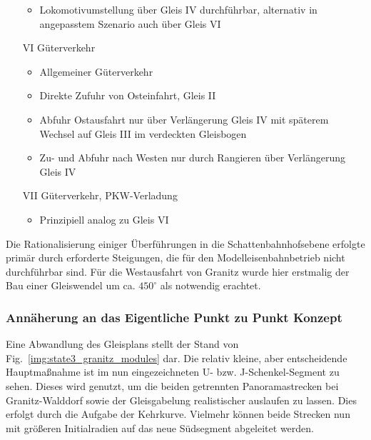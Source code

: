\begin{itemize}
\begin{itemize}
		\item Lokomotivumstellung \"uber Gleis IV durchf\"uhrbar, alternativ in angepasstem Szenario auch \"uber Gleis VI
	\end{itemize}
	\item[VI] G\"uterverkehr
	\begin{itemize}
		\item Allgemeiner G\"uterverkehr
		\item Direkte Zufuhr von Osteinfahrt, Gleis II
		\item Abfuhr Ostausfahrt nur \"uber Verl\"angerung Gleis IV mit sp\"aterem Wechsel auf Gleis III im verdeckten Gleisbogen
		\item Zu- und Abfuhr nach Westen nur durch Rangieren \"uber Verl\"angerung Gleis IV
	\end{itemize}
	\item[VII] G\"uterverkehr, PKW-Verladung
	\begin{itemize}
		\item Prinzipiell analog zu Gleis VI
	\end{itemize}
\end{itemize}
	
Die Rationalisierung einiger \"Uberf\"uhrungen in die Schattenbahnhofsebene erfolgte prim\"ar durch erforderte Steigungen, die f\"ur den Modelleisenbahnbetrieb nicht durchf\"uhrbar sind.
F\"ur die Westausfahrt von Granitz wurde hier erstmalig der Bau einer Gleiswendel um ca. $450^{\circ}$ als notwendig erachtet.



\subsubsection{Ann\"aherung an das Eigentliche Punkt zu Punkt Konzept}
\label{sec:map_development_state3}

Eine Abwandlung des Gleisplans stellt der Stand von Fig.~\ref{img:state3_granitz_modules} dar.
Die relativ kleine, aber entscheidende Hauptma{\ss}nahme ist im nun eingezeichneten U- bzw. J-Schenkel-Segment zu sehen.
Dieses wird genutzt, um die beiden getrennten Panoramastrecken bei Granitz-Walddorf sowie der Gleisgabelung realistischer auslaufen zu lassen.
Dies erfolgt durch die Aufgabe der Kehrkurve.
Vielmehr k\"onnen beide Strecken nun mit gr\"o{\ss}eren Initialradien auf das neue S\"udsegment abgeleitet werden.

